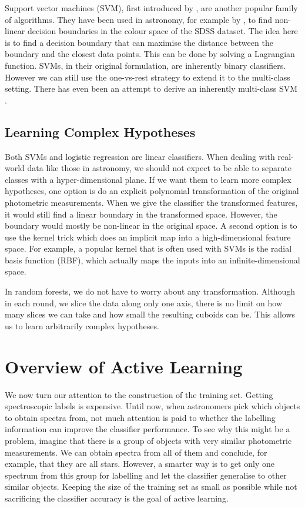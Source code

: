 Support vector machines (SVM), first introduced by , are another popular
family of algorithms. They have been used in astronomy, for example by ,
to find non-linear decision boundaries in the colour space of the SDSS dataset. The idea
here is to find a decision boundary that can maximise the distance between the boundary and the
closest data points. This can be done by solving a Lagrangian function. SVMs, in their original formulation, are inherently binary classifiers.
However we can still use the one-vs-rest strategy to extend it to the multi-class setting.
There has even been an attempt to derive an inherently multi-class SVM \cite{crammer02}.

\subsection{Learning Complex Hypotheses}

Both SVMs and logistic regression are linear classifiers. When dealing with real-world data
like those in astronomy, we should not expect to be able to separate classes with a
hyper-dimensional plane.
If we want them to learn more complex hypotheses, one option
is do an explicit polynomial transformation of the original photometric measurements. When we give
the classifier the transformed features, it would still find a linear boundary in the transformed
space. However, the boundary would mostly be non-linear in the original space. A second
option is to use the kernel trick which does an implicit map into a high-dimensional feature space.
For example, a popular kernel that is often used with SVMs is the radial basis function (RBF),
which actually maps the inputs into an infinite-dimensional space.

In random forests, we do not have to worry about any transformation. Although in each round,
we slice the data along only one axis, there is no limit on how many slices we can take and
how small the resulting cuboids can be. This allows us to learn arbitrarily complex
hypotheses.

\section{Overview of Active Learning}

We now turn our attention to the construction of the training set.
Getting spectroscopic labels is expensive. Until now, when astronomers pick which objects to obtain
spectra from, not much attention is paid to whether the labelling information can improve
the classifier performance. To see why this might be a problem, imagine that there is a group of objects
with very similar photometric measurements. We can obtain spectra from all of them and conclude,
for example,
that they are all stars. However, a smarter way is to get only one spectrum from this group
for labelling and 
let the classifier generalise to other similar objects. Keeping the size of the training set
as small as possible while not sacrificing the classifier accuracy is the goal of active
learning.

